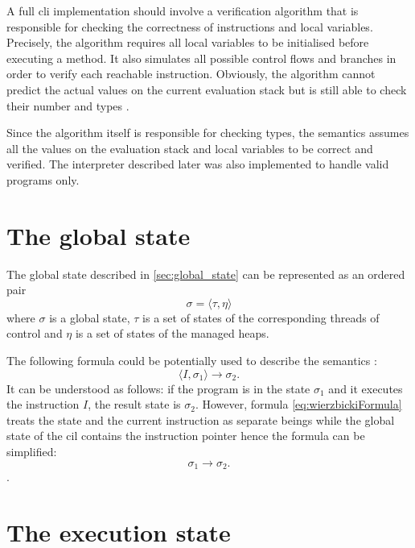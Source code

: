 \documentclass[declaration,shortabstract,english,mgr]{iithesis}
\begin{document}
A full \acrshort{cli} implementation should involve a verification algorithm that is responsible for checking the correctness of instructions and local variables. Precisely, the algorithm requires all local variables to be initialised before executing a method. It also simulates all possible control flows and branches in order to verify each reachable instruction. Obviously, the algorithm cannot predict the actual values on the current evaluation stack but is still able to check their number and types \cite{expertIl}.

Since the algorithm itself is responsible for checking types, the semantics assumes all the values on the evaluation stack and local variables to be correct and verified. The interpreter described later was also implemented to handle valid programs only.

\section{The global state}

The global state described in \ref{sec:global_state} can be represented as an ordered pair
\begin{equation}
	\sigma = \langle\tau, \eta\rangle
\end{equation}
where $\sigma$ is a global state, $\tau$ is a set of states of the corresponding threads of control and $\eta$ is a set of states of the managed heaps.

The following formula could be potentially used to describe the semantics \cite{wierzbicki}:
\begin{equation}
\label{eq:wierzbickiFormula}
	\langle I, \sigma_1\rangle \rightarrow \sigma_2.
\end{equation}
It can be understood as follows: if the program is in the state $\sigma_1$ and it executes the instruction $I$, the result state is $\sigma_2$. However, formula \ref{eq:wierzbickiFormula} treats the state and the current instruction as separate beings while the global state of the \acrshort{cil} contains the instruction pointer hence the formula can be simplified:
\begin{equation}
\label{eq:wierzbickiFormula2}
	\sigma_1 \rightarrow \sigma_2.
\end{equation}.

\section{The execution state}
\label{sec:executionState}
\end{document}
